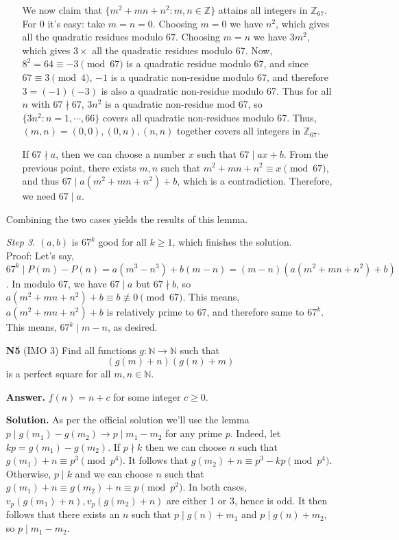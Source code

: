 \documentclass[11pt]{article}
\newcommand{\bbZ}{\mathbb Z}
\newcommand{\<}{\langle}
\renewcommand{\>}{\rangle}
\begin{document}
\begin{enumerate}
\begin{itemize}
		We now claim that $\{m^2+mn+n^2:m, n\in\bbZ\}$ attains all integers in $\bbZ_{67}$. For $0$ it's easy: take $m=n=0$. Choosing $m=0$ we have $n^2$, which gives all the quadratic residues modulo 67. Choosing $m=n$ we have $3m^2$, which gives $3\times$ all the quadratic residues modulo 67. 
		Now, $8^2=64\equiv-3\pmod{67}$ is a quadratic residue modulo 67, and since $67\equiv 3\pmod{4}$, $-1$ is a quadratic non-residue modulo 67, and therefore $3=(-1)(-3)$ is also a quadratic non-residue modulo 67. 
		Thus for all $n$ with $67\nmid 67$, $3n^2$ is a quadratic non-residue mod 67, so $\{3n^2: n=1, \cdots , 66\}$ covers all quadratic non-residues modulo 67. Thus, 
		$(m, n)=(0, 0), (0, n), (n, n)$ together covers all integers in $\bbZ_{67}$. 
		
		If $67\nmid a$, then we can choose a number $x$ such that $67\mid ax+b$. From the previous point, there exists $m, n$ such that $m^2+mn+n^2\equiv x\pmod{67}$, and thus $67\mid a(m^2+mn+n^2)+b$, which is a contradiction. 
		Therefore, we need $67\mid a$. 
	\end{itemize}
	
	Combining the two cases yields the results of this lemma. 
	
	\emph{Step 3.} $(a, b)$ is $67^k$ good for all $k\ge 1$, which finishes the solution. \\
	Proof: Let's say, $67^k\mid P(m)-P(n)=a(m^3-n^3)+b(m-n)=(m-n)(a(m^2+mn+n^2)+b)$. 
	In modulo $67$, we have $67\mid a$ but $67\nmid b$, so $a(m^2+mn+n^2)+b\equiv b\not\equiv 0\pmod{67}$. This means, $a(m^2+mn+n^2)+b$ is relatively prime to $67$, and therefore same to $67^k$. This means, $67^k\mid m-n$, as desired. 
	
	\item [\textbf{N5}] (IMO 3) Find all functions $g:\mathbb{N}\rightarrow\mathbb{N}$ such that\[\left(g(m)+n\right)\left(g(n)+m\right)\]is a perfect square for all $m,n\in\mathbb{N}.$
	
	\textbf{Answer.} $f(n)=n+c$ for some integer $c\ge 0$. 
	
	\textbf{Solution.} 
	As per the official solution we'll use the lemma 
	$p\mid g(m_1)-g(m_2)\to p\mid m_1-m_2$ for any prime $p$. 
	Indeed, let $kp=g(m_1)-g(m_2)$. 
	If $p\nmid k$ then we can choose $n$ such that $g(m_1)+n\equiv p^3\pmod{p^4}$. 
	It follows that $g(m_2)+n\equiv p^3-kp\pmod{p^4}$. 
	Otherwise, $p\mid k$ and we can choose $n$ such that $g(m_1)+n\equiv g(m_2)+n\equiv p\pmod{p^2}$. 
	In both cases, $v_p(g(m_1)+n), v_p(g(m_2)+n)$ are either 1 or 3, hence is odd. 
	It then follows that there exists an $n$ such that $p\mid g(n)+m_1$ and $p\mid g(n)+m_2$, so $p\mid m_1-m_2$. 
	

\end{enumerate}
\end{document}
